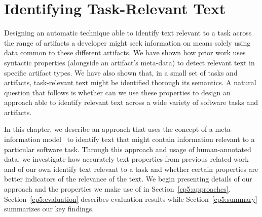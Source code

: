 \setcounter{chapter}{4}
\setcounter{rq}{1}


\chapter{Identifying Task-Relevant Text}
\label{ch:identifying}



Designing an automatic technique able to identify text relevant to a task across the range of artifacts a developer might seek information on means solely using data common to these different artifacts.
We have shown how  prior work uses syntactic properties (alongside an artifact's meta-data)
to detect relevant text in specific artifact types.
We have also shown that, in a small set of tasks and artifacts, task-relevant text might be identified thorough its semantics.
A natural question that follows is whether can we use these properties to design an approach able to identify relevant text across a wide variety of software tasks and artifacts.



In this chapter, we describe an approach that uses
the concept of a meta-information model~\cite{Ponzanelli2015} to
 identify text that might contain information relevant to a particular software task.
Through this approach and usage of human-annotated data, we 
investigate how accurately text properties from previous related work and of our own
  identify text relevant to a task and whether certain properties are better indicators of the relevance of the text.
We begin presenting details of our approach and the properties we make use of in Section~\ref{cp5:approaches}.
Section~\ref{cp5:evaluation} describes evaluation results while
Section~\ref{cp5:summary} summarizes our key findings.







